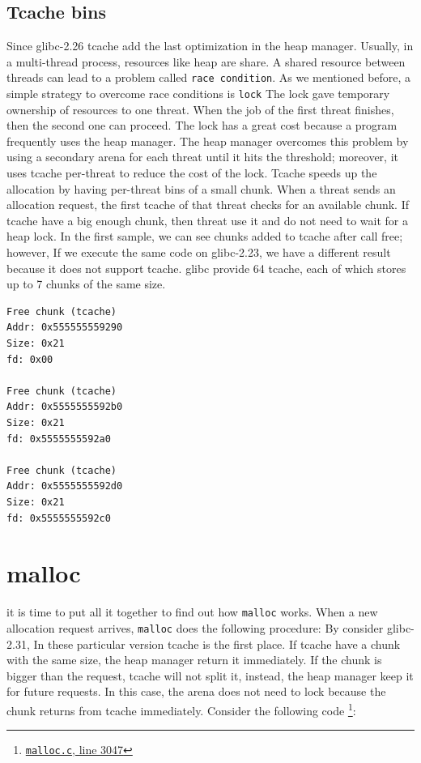 \documentclass{masterthesis}
\newcommand*\libc{glibc}
\newcommand*\tch{tcache}
\newcommand*\Tch{Tcache\xspace}
\newcommand*\mallocc{\lstinline{malloc}\xspace}
\begin{document}
\subsection{\Tch bins}
\label{subsect:tcache}
Since \libc{-2.26} \tch{} add the last optimization in the heap manager. Usually, in a multi-thread process, resources like heap are share. A shared resource between threads can lead to a problem called \lstinline{race condition}. As we mentioned before, a simple strategy to overcome race conditions is \lstinline{lock} The lock gave temporary ownership of resources to one threat. When the job of the first threat finishes, then the second one can proceed. The lock has a great cost because a program frequently uses the heap manager. The heap manager overcomes this problem by using a secondary arena for each threat until it hits the threshold; moreover, it uses \tch{} per-threat to reduce the cost of the lock. \Tch{} speeds up the allocation by having per-threat bins of a small chunk. When a threat sends an allocation request, the first \tch{} of that threat checks for an available chunk. If \tch{} have a big enough chunk, then threat use it and do not need to wait for a heap lock. In the first sample, we can see chunks added to \tch{} after call free; however, If we execute the same code on \libc{-2.23}, we have a different result because it does not support \tch{}. \libc{} provide 64 \tch{}, each of which stores up to 7 chunks of the same size. 

\begin{lstlisting}[frame=tlrb]
Free chunk (tcache)
Addr: 0x555555559290
Size: 0x21
fd: 0x00

Free chunk (tcache)
Addr: 0x5555555592b0
Size: 0x21
fd: 0x5555555592a0

Free chunk (tcache)
Addr: 0x5555555592d0
Size: 0x21
fd: 0x5555555592c0
\end{lstlisting}

\section{malloc}
\label{sect:malloc}
it is time to put all it together to find out how \mallocc{} works. When a new allocation request arrives, \mallocc{} does the following procedure:
By consider \libc{-2.31}, In these particular version \tch{} is the first place. If \tch{} have a chunk with the same size, the heap manager return it immediately. If the chunk is bigger than the request, \tch{} will not split it, instead, the heap manager keep it for future requests. In this case, the arena does not need to lock because the chunk returns from \tch{} immediately. Consider the following code \footnote{\href{https://sourceware.org/git/?p=glibc.git;a=blob;f=malloc/malloc.c;h=f7cd29bc2f93e1082ee77800bd64a4b2a2897055;hb=9ea3686266dca3f004ba874745a4087a89682617\#l3047}{\texttt{malloc.c}, line 3047}}:
\end{document}
